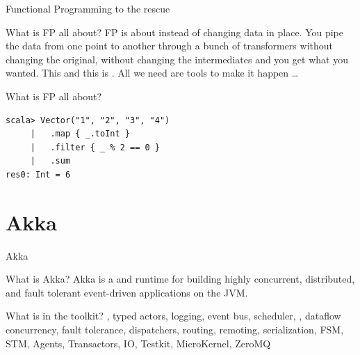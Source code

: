 \begin{frame}[fragile]{Functional Programming to the rescue}
\begin{block}{What is FP all about?}
FP is about  instead of changing data in place.
You pipe the data from one point to another through a bunch of transformers
without changing the original, without changing the intermediates and you get
what you wanted. This  and this is . All
we need are tools to make it happen \ldots
\end{block}

\begin{exampleblock}{What is FP all about?}
\begin{lstlisting}
scala> Vector("1", "2", "3", "4")
     |   .map { _.toInt }
     |   .filter { _ % 2 == 0 }
     |   .sum
res0: Int = 6
\end{lstlisting}
\end{exampleblock}
\end{frame}

\section{Akka}
\begin{frame}{Akka}
\begin{block}{What is Akka?}
Akka is a  and runtime for building highly concurrent,
distributed, and fault tolerant event-driven applications on the JVM.
\end{block}
\pause
\begin{block}{What is in the toolkit?}
, typed actors, logging, event bus, scheduler,
, dataflow concurrency, fault tolerance, dispatchers,
routing, remoting, serialization, FSM, STM, Agents, Transactors, IO, Testkit,
MicroKernel, ZeroMQ
\end{block}
\end{frame}

